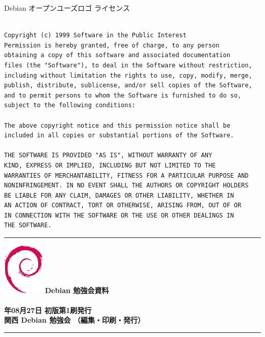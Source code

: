 \documentclass[mingoth,a4paper]{jsarticle}
\newcommand{\debmtgyear}{2017}
\newcommand{\debmtgdate}{27}
\newcommand{\debmtgmonth}{08}
\begin{document}
\begin{center}
Debian オープンユーズロゴ ライセンス
\end{center}

\begin{multicols}{2}
 \begin{fontsize}{6}{6}
 \begin{verbatim}

Copyright (c) 1999 Software in the Public Interest
Permission is hereby granted, free of charge, to any person
obtaining a copy of this software and associated documentation
files (the "Software"), to deal in the Software without restriction,
including without limitation the rights to use, copy, modify, merge,
publish, distribute, sublicense, and/or sell copies of the Software,
and to permit persons to whom the Software is furnished to do so,
subject to the following conditions:

The above copyright notice and this permission notice shall be
included in all copies or substantial portions of the Software.

THE SOFTWARE IS PROVIDED "AS IS", WITHOUT WARRANTY OF ANY
KIND, EXPRESS OR IMPLIED, INCLUDING BUT NOT LIMITED TO THE
WARRANTIES OF MERCHANTABILITY, FITNESS FOR A PARTICULAR PURPOSE AND
NONINFRINGEMENT. IN NO EVENT SHALL THE AUTHORS OR COPYRIGHT HOLDERS
BE LIABLE FOR ANY CLAIM, DAMAGES OR OTHER LIABILITY, WHETHER IN
AN ACTION OF CONTRACT, TORT OR OTHERWISE, ARISING FROM, OUT OF OR
IN CONNECTION WITH THE SOFTWARE OR THE USE OR OTHER DEALINGS IN
THE SOFTWARE.
 \end{verbatim}
 \end{fontsize}
\end{multicols}

\printindex

 \begin{minipage}[b]{0.2\hsize}
 \end{minipage}
 \begin{minipage}[b]{0.8\hsize}

 \vspace*{15cm}
 \rule{\hsize}{1mm}
 \vspace{2mm}
 \includegraphics[width=2cm]{image200502/openlogo-nd.eps}
 \noindent \Large \bfseries{Debian 勉強会資料}\\ \\
 \noindent \normalfont \debmtgyear{}年\debmtgmonth{}月\debmtgdate{}日 \hspace{5mm}  初版第1刷発行\\
 \noindent \normalfont 関西 Debian 勉強会 （編集・印刷・発行）\\
 \rule{\hsize}{1mm}
 \end{minipage}
\end{document}
